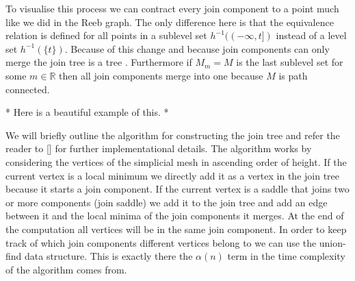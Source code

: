     
To visualise this process we can contract every join component to a point much like we did in the Reeb graph. The only difference here is that the equivalence relation is defined for all points in a sublevel set $h^{-1}((-\infty, t])$ instead of a level set $h^{-1}(\{t\})$. Because of this change and because join components can only merge the join tree is a tree \cite{comp-topo}. Furthermore if $M_m = M$ is the last sublevel set for some $m \in \mathbb{R}$ then all join components merge into one because $M$ is path connected.

* Here is a beautiful example of this. *


We will briefly outline the algorithm for constructing the join tree and refer the reader to [] for further implementational details. The algorithm works by considering the vertices of the simplicial mesh in ascending order of height. If the current vertex is a local minimum we directly add it as a vertex in the join tree because it starts a join component. If the current vertex is a saddle that joins two or more components (join saddle) we add it to the join tree and add an edge between it and the local minima of the join components it merges. At the end of the computation all vertices will be in the same join component. In order to keep track of which join components different vertices belong to we can use the union-find data structure. This is exactly there the $\alpha(n)$ term in the time complexity of the algorithm comes from.

